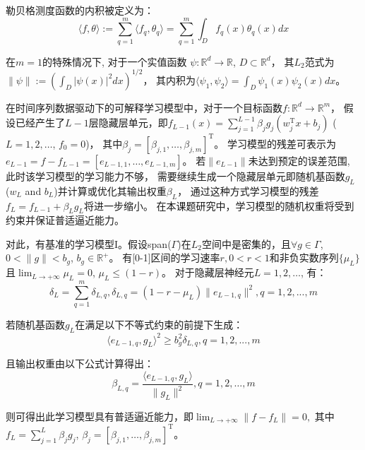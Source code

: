 勒贝格测度函数的内积被定义为：
\begin{equation}\label{multiple_inner}
    \langle f,\theta\rangle:=\sum_{q=1}^{m}\langle f_q,\theta_q\rangle=\sum_{q=1}^{m}\int_{D}f_q(x)\theta_q(x)dx
  \end{equation}

在$m=1$的特殊情况下,
对于一个实值函数 $\psi:\mathbb{R}^{d}\rightarrow \mathbb{R}$, $D\subset \mathbb{R}^{d}$，
其$L_2$范式为$ \|\psi\|:=(\int_{D}|\psi(x)|^2dx)^{1/2}$，
其内积为$\langle \psi_1,\psi_2\rangle=\int_{D}\psi_1(x)\psi_2(x)dx$。

在时间序列数据驱动下的可解释学习模型中，对于一个目标函数$f:\mathbb{R}^{d}\rightarrow \mathbb{R}^{m}$，
假设已经产生了$L-1$层隐藏层单元，即$f_{L-1}(x)=\sum_{j=1}^{L-1}\beta_jg_j(w_j^\mathrm{T}x+b_j)$ ($L=1,2,\ldots$, $f_0=0$)，
其中$\beta_j=[\beta_{j,1},\ldots,\beta_{j,m}]^\mathrm{T}$。
学习模型的残差可表示为$e_{L-1}=f-f_{L-1}=[e_{L-1,1},\ldots,e_{L-1,m}]$。
若$\|e_{L-1}\|$未达到预定的误差范围, 此时该学习模型的学习能力不够，
需要继续生成一个隐藏层单元即随机基函数$g_L$ ($w_L$ and $b_L$)并计算或优化其输出权重$\beta_L$，
通过这种方式学习模型的残差$f_{L}=f_{L-1}+\beta_Lg_L$将进一步缩小。
在本课题研究中，学习模型的随机权重将受到约束并保证普适逼近能力。

对此，有基准的学习模型I。假设span($\Gamma$)在$L_2$空间中是密集的，且$\forall g\in \Gamma$, $0<\|g\|<b_g$, $b_g\in \mathbb{R}^{+}$。
有[0-1]区间的学习速率$r, 0<r<1$和非负实数序列$\{\mu_L\}$且$\lim_{L\rightarrow+\infty}\mu_L=0$, 
$\mu_L\leq (1-r)$。
对于隐藏层神经元$L=1,2,\ldots$, 有：
\begin{equation}\label{delta1}
    \delta_{L}=\sum_{q=1}^{m}\delta_{L,q}, \delta_{L,q}=(1-r-\mu_L)\|e_{L-1,q}\|^2, q=1,2,...,m
    \end{equation}

若随机基函数$g_L$在满足以下不等式约束的前提下生成：
\begin{equation}\label{step1}
    \langle e_{L-1,q},g_L\rangle^2\geq b_g^2\delta_{L,q}, q=1,2,...,m
    \end{equation}

且输出权重由以下公式计算得出：
\begin{equation}\label{step2}
    \beta_{L,q}=\frac{\langle e_{L-1,q},g_L\rangle}{\|g_L\|^2}, q=1,2,\ldots,m
    \end{equation}

则可得出此学习模型具有普适逼近能力，即$\lim_{L\rightarrow +\infty}\|f-f_L\|=0,$
其中$f_L=\sum_{j=1}^{L}\beta_{j}g_j$, $\beta_j=[\beta_{j,1},\ldots,\beta_{j,m}]^{\mathrm{T}}$。

